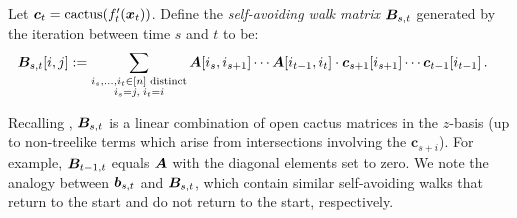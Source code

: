 \begin{definition}\label{def:self-avoiding}
Let ${\bm c}_t = \operatorname{cactus}(f'_t({\bm x}_t))$.
Define the \emph{self-avoiding walk matrix} ${\bm B}_{s,t}$ generated by the iteration between time $s$ and $t$ to be:
\begin{align*}
    {\bm B}_{s,t}[i,j] &:= \sum_{\substack{i_{s},\dots, i_{t} \in [n] \textnormal{ distinct}\\i_{s} = j,\; i_{t} = i}} 
    {\bm A}[i_s, i_{s+1}] \cdots {\bm A}[i_{t-1},i_t] \cdot \bm c_{s+1}[i_{s+1}] \cdots \bm c_{t-1}[i_{t-1}]\,.
\end{align*}
\end{definition}

\noindent Recalling , ${\bm B}_{s,t}$
is a linear combination of
open cactus matrices in the $z$-basis (up to non-treelike terms which arise from intersections involving the $\bm c_{s+i}$).
For example, ${\bm B}_{t-1,t}$ equals ${\bm A}$ with the diagonal elements set to zero.
We note the analogy between ${\bm b}_{s,t}$ and ${\bm B}_{s,t}$, which contain similar self-avoiding walks that return to the start and do not return to the start, respectively.

